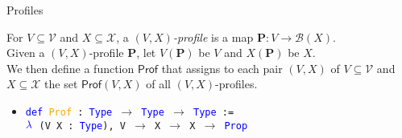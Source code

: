 \documentclass[12pt,xcolor=svgnames,blue,aspectratio=169]{beamer}
\begin{document}
\begin{frame}{Profiles}

\begin{definition}\label{ProfileDef} For $V\subseteq\mathcal{V}$ and $X\subseteq\mathcal{X}$, a \emph{$(V,X)$-profile} is a map $\mathbf{P}:V\to \mathcal{B}(X)$. \\[8pt]
Given a $(V,X)$-profile $\mathbf{P}$, let $V(\mathbf{P})$ be $V$ and $X(\mathbf{P})$  be $X$. \\[8pt] We then define a function $\mathsf{Prof}$ that assigns to each pair $(V,X)$ of $V\subseteq\mathcal{V}$ and $X\subseteq\mathcal{X}$ the set $\mathsf{Prof}(V,X)$ of all $(V,X)$-profiles. %
\end{definition}


\vfill





\pause
\begin{itemize}
\item[] \texttt{\textcolor{blue}{def} \textcolor{orange}{Prof} : \textcolor{blue}{Type} $\to$ \textcolor{blue}{Type} $\to$ \textcolor{blue}{Type} := }\\\texttt{$\textcolor{blue}{\lambda}$ (V X : \textcolor{blue}{Type}), V $\to$ X $\to$ X $\to$ \textcolor{blue}{Prop}}
\end{itemize}

\end{frame}
\end{document}
